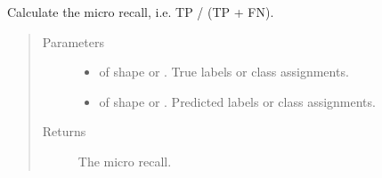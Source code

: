 \documentclass[letterpaper,10pt,english]{sphinxmanual}
\begin{document}
\begin{fulllineitems}
\label{\detokenize{pusion.evaluation.evaluation_metrics:pusion.evaluation.evaluation_metrics.micro_recall}}
\sphinxAtStartPar
Calculate the micro recall, i.e.  TP / (TP + FN).
\begin{quote}\begin{description}
\item[{Parameters}] \leavevmode\begin{itemize}
\item {} 
\sphinxAtStartPar
{} \textendash{}  of shape  or . True labels or class assignments.

\item {} 
\sphinxAtStartPar
{} \textendash{}  of shape  or . Predicted labels or
class assignments.

\end{itemize}

\item[{Returns}] \leavevmode
\sphinxAtStartPar
The micro recall.

\end{description}\end{quote}

\end{fulllineitems}

\end{document}
